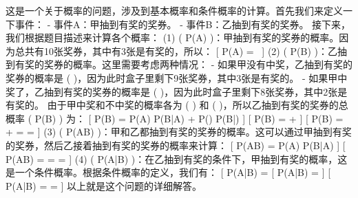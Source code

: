 
这是一个关于概率的问题，涉及到基本概率和条件概率的计算。首先我们来定义一下事件： - 事件A：甲抽到有奖的奖券。 - 事件B：乙抽到有奖的奖券。 接下来，我们根据题目描述来计算各个概率： (1) ( P(A) )：甲抽到有奖的奖券的概率。因为总共有10张奖券，其中有3张是有奖的，所以： [ P(A) =  ~] (2) ( P(B) )：乙抽到有奖的奖券的概率。这里需要考虑两种情况： - 如果甲没有中奖，乙抽到有奖的奖券的概率是 (  )，因为此时盒子里剩下9张奖券，其中3张是有奖的。 - 如果甲中奖了，乙抽到有奖的奖券的概率是 (  )，因为此时盒子里剩下8张奖券，其中2张是有奖的。 由于甲中奖和不中奖的概率各为 (  ) 和 (  )，所以乙抽到有奖的奖券的总概率 ( P(B) ) 为： [ P(B) = P(A) \cdot P(B|A) + P() \cdot P(B|) ] [ P(B) =  \cdot {} +  \cdot {} ] [ P(B) =  +  =  =  ] (3) ( P(AB) )：甲和乙都抽到有奖的奖券的概率。这可以通过甲抽到有奖的奖券，然后乙接着抽到有奖的奖券的概率来计算： [ P(AB) = P(A) \cdot P(B|A) ] [ P(AB) =  \cdot {} =  =  ] (4) ( P(A|B) )：在乙抽到有奖的条件下，甲抽到有奖的概率，这是一个条件概率。根据条件概率的定义，我们有： [ P(A|B) =  [ P(A|B) =  ] [ P(A|B) =  \cdot {} =  ] 以上就是这个问题的详细解答。


